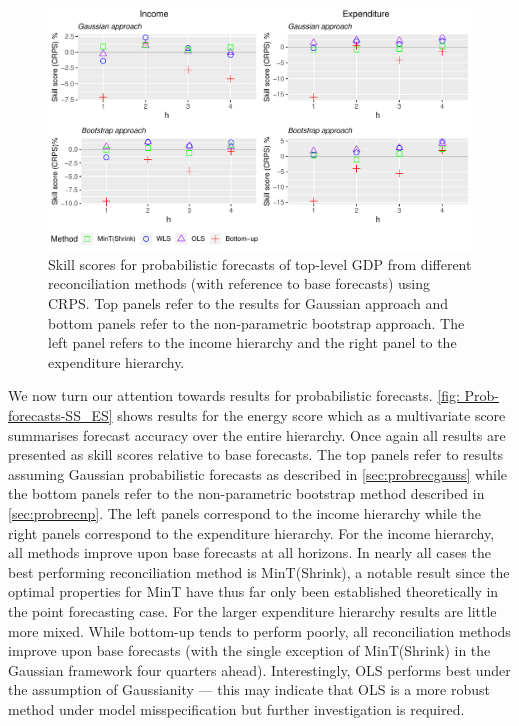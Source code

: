 \documentclass[graybox]{svmult}
\begin{document}
\begin{figure}
	\centering
	\small
	\includegraphics[width=\textwidth]{Figs/Results/ProbF_UnivS.pdf}
	\caption{Skill scores for probabilistic forecasts of top-level GDP from different reconciliation methods (with reference to base forecasts) using CRPS. Top panels refer to the results for Gaussian approach and bottom panels refer to the non-parametric bootstrap approach. The left panel refers to the income hierarchy and the right panel to the expenditure hierarchy.}
	\label{fig: Prob-forecasts-SS_CRPS}
\end{figure}

We now turn our attention towards results for probabilistic forecasts. \autoref{fig: Prob-forecasts-SS_ES} shows results for the energy score which as a multivariate score summarises forecast accuracy over the entire hierarchy. Once again all results are presented as skill scores relative to base forecasts. The top panels refer to results assuming Gaussian probabilistic forecasts as described in \autoref{sec:probrecgauss} while the bottom panels refer to the non-parametric bootstrap method described in \autoref{sec:probrecnp}. The left panels correspond to the income hierarchy while the right panels correspond to the expenditure hierarchy. For the income hierarchy, all methods improve upon base forecasts at all horizons. In nearly all cases the best performing reconciliation method is MinT(Shrink), a notable result since the optimal properties for MinT have thus far only been established theoretically in the point forecasting case. For the larger expenditure hierarchy results are little more mixed. While bottom-up tends to perform poorly, all reconciliation methods improve upon base forecasts (with the single exception of MinT(Shrink) in the Gaussian framework four quarters ahead). Interestingly, OLS performs best under the assumption of Gaussianity --- this may indicate that OLS is a more robust method under model misspecification but further investigation is required.
\end{document}
